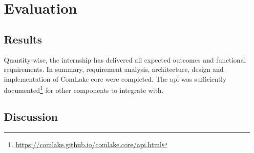 \chapter{Evaluation}

\section{Results}
Quantity-wise, the internship has delivered
all expected outcomes and functional requirements.  In summary,
requirement analysis, architecture, design and implementation
of ComLake core were completed.  The \gls{api} was sufficiently
documented\footnote{\url{https://comlake.github.io/comlake.core/api.html}}
for other components to integrate with.

\section{Discussion}
